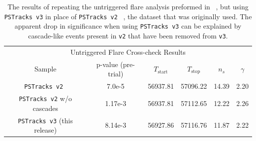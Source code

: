 \documentclass[aps,10pt,prd,twocolumn,floats,letterpaper,showpacs,nofootinbib,bibnotes,notitlepage,superscriptaddress,floatfix]{revtex4-1}
\newcommand{\MA}[1]{{\color{black}#1}}
\begin{document}
\begin{table}[p]
\centering
\begin{ruledtabular}
\begin{tabular}{cccccc}
\multicolumn{6}{c}{Untriggered Flare Cross-check Results} \\[0.1cm]
Sample & p-value (pre-trial) & $T_\text{start}$ & $T_\text{stop}$ & $n_s$ & $\gamma$ \\ 
\MA{\tt PSTracks v2}~\cite{IceCube:2018cha,IceCube:2019} & 7.0e-5 & 56937.81 & 57096.22 & 14.39 & 2.20  \\
\MA{\tt PSTracks v2} w/o cascades & 1.17e-3 & 56937.81 & 57112.65 & 12.22 & 2.26 \\
\MA{\tt PSTracks v3} (this release) & 8.14e-3 & 56927.86 & 57116.76 & 11.87 & 2.22\\
\end{tabular}
\end{ruledtabular}
\caption[]{The results of repeating the untriggered flare analysis preformed in ~\cite{IceCube:2018cha}, but using {\tt PSTracks v3} in place of {\tt PSTracks v2} ~\cite{IceCube:2019}, the dataset that was originally used. The apparent drop in significance when using {\tt PSTracks v3} can be explained by cascade-like events present in {\tt v2} that have been removed from {\tt v3}.}\label{tab:TXSCrossChecks}
\end{table}
\end{document}

